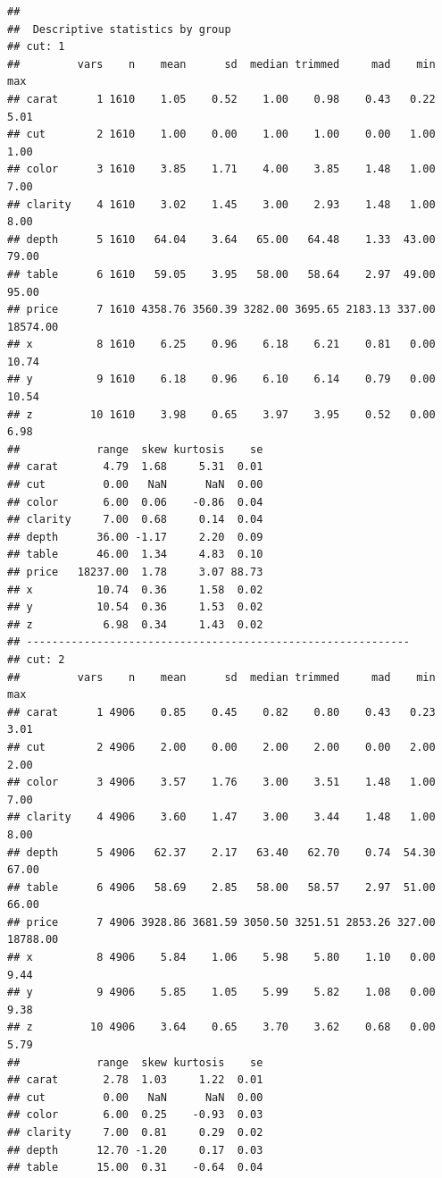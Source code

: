\documentclass[
]{book}
\begin{document}
\begin{verbatim}
## 
##  Descriptive statistics by group 
## cut: 1
##         vars    n    mean      sd  median trimmed     mad    min      max
## carat      1 1610    1.05    0.52    1.00    0.98    0.43   0.22     5.01
## cut        2 1610    1.00    0.00    1.00    1.00    0.00   1.00     1.00
## color      3 1610    3.85    1.71    4.00    3.85    1.48   1.00     7.00
## clarity    4 1610    3.02    1.45    3.00    2.93    1.48   1.00     8.00
## depth      5 1610   64.04    3.64   65.00   64.48    1.33  43.00    79.00
## table      6 1610   59.05    3.95   58.00   58.64    2.97  49.00    95.00
## price      7 1610 4358.76 3560.39 3282.00 3695.65 2183.13 337.00 18574.00
## x          8 1610    6.25    0.96    6.18    6.21    0.81   0.00    10.74
## y          9 1610    6.18    0.96    6.10    6.14    0.79   0.00    10.54
## z         10 1610    3.98    0.65    3.97    3.95    0.52   0.00     6.98
##            range  skew kurtosis    se
## carat       4.79  1.68     5.31  0.01
## cut         0.00   NaN      NaN  0.00
## color       6.00  0.06    -0.86  0.04
## clarity     7.00  0.68     0.14  0.04
## depth      36.00 -1.17     2.20  0.09
## table      46.00  1.34     4.83  0.10
## price   18237.00  1.78     3.07 88.73
## x          10.74  0.36     1.58  0.02
## y          10.54  0.36     1.53  0.02
## z           6.98  0.34     1.43  0.02
## ------------------------------------------------------------ 
## cut: 2
##         vars    n    mean      sd  median trimmed     mad    min      max
## carat      1 4906    0.85    0.45    0.82    0.80    0.43   0.23     3.01
## cut        2 4906    2.00    0.00    2.00    2.00    0.00   2.00     2.00
## color      3 4906    3.57    1.76    3.00    3.51    1.48   1.00     7.00
## clarity    4 4906    3.60    1.47    3.00    3.44    1.48   1.00     8.00
## depth      5 4906   62.37    2.17   63.40   62.70    0.74  54.30    67.00
## table      6 4906   58.69    2.85   58.00   58.57    2.97  51.00    66.00
## price      7 4906 3928.86 3681.59 3050.50 3251.51 2853.26 327.00 18788.00
## x          8 4906    5.84    1.06    5.98    5.80    1.10   0.00     9.44
## y          9 4906    5.85    1.05    5.99    5.82    1.08   0.00     9.38
## z         10 4906    3.64    0.65    3.70    3.62    0.68   0.00     5.79
##            range  skew kurtosis    se
## carat       2.78  1.03     1.22  0.01
## cut         0.00   NaN      NaN  0.00
## color       6.00  0.25    -0.93  0.03
## clarity     7.00  0.81     0.29  0.02
## depth      12.70 -1.20     0.17  0.03
## table      15.00  0.31    -0.64  0.04

\end{verbatim}
\end{document}
